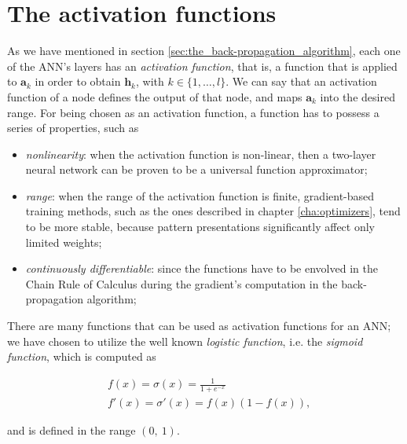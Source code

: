	\section{The activation functions} %
	\label{sec:the_activation_functions}
		As we have mentioned in section \ref{sec:the_back-propagation_algorithm}, each one of the ANN's layers
		has an \textit{activation function}, that is, a function that is applied to $\mathbf{a}_{k}$ in order to
		obtain $\mathbf{h}_k$, with $k \in \{1,\ldots,l\}$. We can say that an activation function of a node
		defines the output of that node, and maps $\mathbf{a}_{k}$ into the desired range. For being chosen as
		an activation function, a function has to possess a series of properties, such as

		\begin{itemize}
			\item \textit{nonlinearity}: when the activation function is non-linear, then a two-layer neural
			network can be proven to be a universal function approximator;
			\item \textit{range}: when the range of the activation function is finite, gradient-based training
			methods, such as the ones described in chapter \ref{cha:optimizers}, tend to be more stable, because
			pattern presentations significantly affect only limited weights;
			\item \textit{continuously differentiable}: since the functions have to be envolved in the Chain Rule
			of Calculus during the gradient's computation in the back-propagation algorithm;
		\end{itemize}

		There are many functions that can be used as activation functions for an ANN; we have chosen to utilize the
		well known \textit{logistic function}, i.e. the \textit{sigmoid function}, which is computed as

		\begin{align*}
		    &f(x) = \sigma(x) = \frac{1}{1 + e^{-x}} \\
		    &f'(x) = \sigma'(x) = f(x)(1 - f(x)),
		\end{align*}

		and is defined in the range $\left ( 0,\ 1 \right )$.


